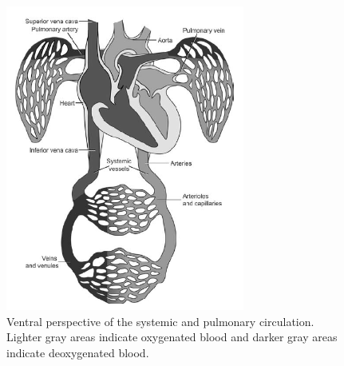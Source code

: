 \begin{figure}[ht]
\centering
\includegraphics[width=0.7\textwidth]{images/CVS.png}
\caption{Ventral perspective of the systemic and pulmonary circulation. Lighter gray areas indicate oxygenated blood and darker gray areas indicate deoxygenated blood.}
\label{CVSImg}
\end{figure}

